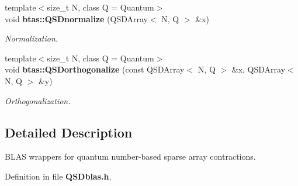 \begin{DoxyCompactItemize}
\item 
{\footnotesize template$<$size\-\_\-t N, class Q  = Quantum$>$ }\\void {\bf btas\-::\-Q\-S\-Dnormalize} (Q\-S\-D\-Array$<$ N, Q $>$ \&x)
\begin{DoxyCompactList}\small\item\em Normalization. \end{DoxyCompactList}\item 
{\footnotesize template$<$size\-\_\-t N, class Q  = Quantum$>$ }\\void {\bf btas\-::\-Q\-S\-Dorthogonalize} (const Q\-S\-D\-Array$<$ N, Q $>$ \&x, Q\-S\-D\-Array$<$ N, Q $>$ \&y)
\begin{DoxyCompactList}\small\item\em Orthogonalization. \end{DoxyCompactList}\end{DoxyCompactItemize}


\subsection{Detailed Description}
B\-L\-A\-S wrappers for quantum number-\/based sparse array contractions. 

Definition in file {\bf Q\-S\-Dblas.\-h}.

